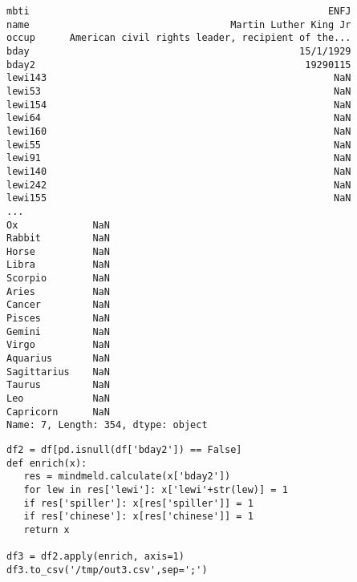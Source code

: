 \documentclass[12pt,fleqn]{article}\usepackage{common}
\begin{document}
\begin{verbatim}
mbti                                                    ENFJ
name                                   Martin Luther King Jr
occup      American civil rights leader, recipient of the...
bday                                               15/1/1929
bday2                                               19290115
lewi143                                                  NaN
lewi53                                                   NaN
lewi154                                                  NaN
lewi64                                                   NaN
lewi160                                                  NaN
lewi55                                                   NaN
lewi91                                                   NaN
lewi140                                                  NaN
lewi242                                                  NaN
lewi155                                                  NaN
...
Ox             NaN
Rabbit         NaN
Horse          NaN
Libra          NaN
Scorpio        NaN
Aries          NaN
Cancer         NaN
Pisces         NaN
Gemini         NaN
Virgo          NaN
Aquarius       NaN
Sagittarius    NaN
Taurus         NaN
Leo            NaN
Capricorn      NaN
Name: 7, Length: 354, dtype: object
\end{verbatim}


\begin{verbatim}
df2 = df[pd.isnull(df['bday2']) == False]
def enrich(x):
   res = mindmeld.calculate(x['bday2'])
   for lew in res['lewi']: x['lewi'+str(lew)] = 1
   if res['spiller']: x[res['spiller']] = 1
   if res['chinese']: x[res['chinese']] = 1
   return x

df3 = df2.apply(enrich, axis=1)
df3.to_csv('/tmp/out3.csv',sep=';')
\end{verbatim}
\end{document}
